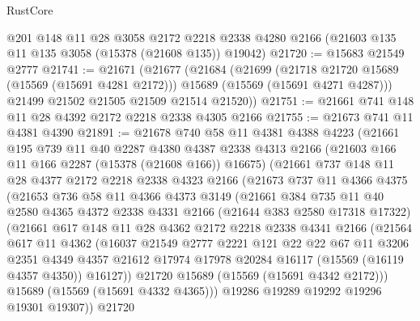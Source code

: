 \begin{lexlean}{RustCore}
\begin{coremodule}
    @201
    @148
    @11
    @28
    @3058
    @2172
    @2218
    @2338
    @4280
    @2166
    (@21603 @135 @11 @135 @3058 (@15378 (@21608 @135)) @19042)
@21720 := @15683 @21549 @2777
@21741 := @21671
    (@21677
      (@21684
        (@21699
          (@21718 @21720 @15689 (@15569 (@15691 @4281 @2172)))
          @15689
          (@15569 (@15691 @4271 @4287)))
        @21499
        @21502
        @21505
        @21509
        @21514
        @21520))
@21751 := @21661 @741 @148 @11 @28 @4392 @2172 @2218 @2338 @4305 @2166
@21755 := @21673 @741 @11 @4381 @4390
@21891 := @21678
    @740
    @58
    @11
    @4381
    @4388
    @4223
    (@21661
      @195
      @739
      @11
      @40
      @2287
      @4380
      @4387
      @2338
      @4313
      @2166
      (@21603 @166 @11 @166 @2287 (@15378 (@21608 @166)) @16675)
      (@21661
        @737
        @148
        @11
        @28
        @4377
        @2172
        @2218
        @2338
        @4323
        @2166
        (@21673
          @737
          @11
          @4366
          @4375
          (@21653
            @736
            @58
            @11
            @4366
            @4373
            @3149
            (@21661
              @384
              @735
              @11
              @40
              @2580
              @4365
              @4372
              @2338
              @4331
              @2166
              (@21644 @383 @2580 @17318 @17322)
              (@21661
                @617
                @148
                @11
                @28
                @4362
                @2172
                @2218
                @2338
                @4341
                @2166
                (@21564
                  @617
                  @11
                  @4362
                  (@16037
                    @21549
                    @2777
                    @2221
                    @121
                    @22
                    @22
                    @67
                    @11
                    @3206
                    @2351
                    @4349
                    @4357
                    @21612
                    @17974
                    @17978
                    @20284
                    @16117
                    (@15569 (@16119 @4357 @4350))
                    @16127))
                @21720
                @15689
                (@15569 (@15691 @4342 @2172)))
              @15689
              (@15569 (@15691 @4332 @4365)))
            @19286
            @19289
            @19292
            @19296
            @19301
            @19307))
        @21720

\end{coremodule}
\end{lexlean}
